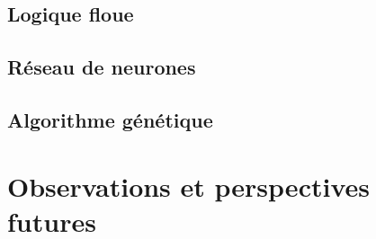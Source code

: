 \documentclass[12pt,letterpaper]{article}
\begin{document}
\subsection{Logique floue}

\subsection{Réseau de neurones} %

\subsection{Algorithme génétique}

\section{Observations et perspectives futures}
\end{document}
